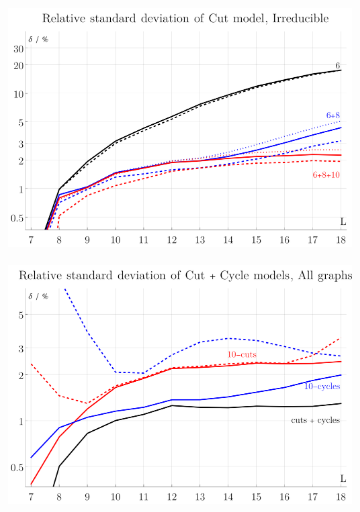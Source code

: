 \documentclass[11pt]{scrartcl}
\numberwithin{equation}{section}
\begin{document}
\begin{figure}[htb]

	\begin{subfigure}{ .49 \linewidth}
		\centering
		\includegraphics[width=\linewidth]{figures/cut_standard_deviation}
		\subcaption{}
		\label{fig:cut_relative_standard_deviation}
	\end{subfigure}
		\begin{subfigure}{ .49 \linewidth}
		\centering
		\includegraphics[width=\linewidth]{figures/cut_cycle_reducible}
		\subcaption{}
		\label{fig:cut_cycle_relative_standard_deviation_reducible}
	\end{subfigure}
	

\end{figure}
\end{document}

